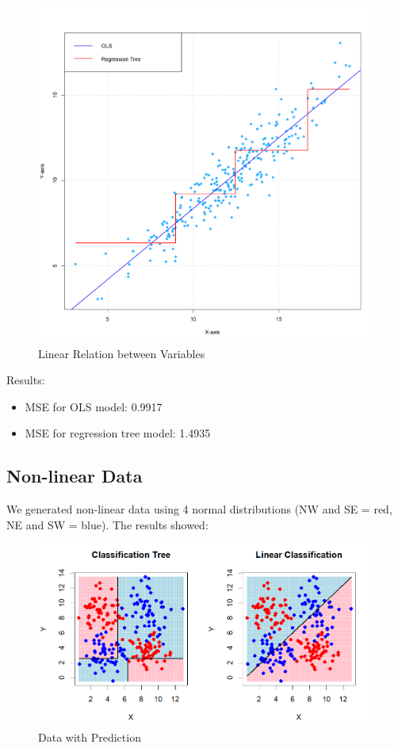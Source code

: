 \documentclass[12pt]{article}
\begin{document}
\begin{figure}
    \centering
    \includegraphics[scale=0.50]{OLS vs Tree.png}
    \caption{Linear Relation between Variables}
    \label{fig:sub1}  %
\end{figure}


Results:
\begin{itemize}
    \item MSE for OLS model: 0.9917 
    \item MSE for regression tree model: 1.4935 
\end{itemize}


\subsection{Non-linear Data}
We generated non-linear data using 4 normal distributions (NW and SE = red, NE and SW = blue). The results showed:


\begin{figure}
    \centering
    \includegraphics[scale=0.50]{NLD Pred.png}
    \caption{Data with Prediction}
    \label{fig:sub2}  %
\end{figure}
\end{document}
